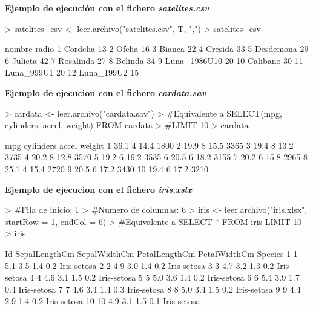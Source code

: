 \documentclass [a4paper] {article}
\begin{document}
\hfil \textbf{Ejemplo de ejecución con el fichero \textit{satelites.csv}} \par
\begin{Schunk}
\begin{Sinput}
> satelites_csv <- leer.archivo("satelites.csv", T, ",")
> satelites_csv
\end{Sinput}
\begin{Soutput}
         nombre radio
1      Cordelia    13
2        Ofelia    16
3        Bianca    22
4       Cresida    33
5     Desdemona    29
6       Julieta    42
7     Rosalinda    27
8       Belinda    34
9  Luna_1986U10    20
10     Calibano    30
11   Luna_999U1    20
12   Luna_199U2    15
\end{Soutput}
\end{Schunk}
\newpage
\hfil \textbf{Ejemplo de ejecucion con el fichero \textit{cardata.sav}} \par
\begin{Schunk}
\begin{Sinput}
> cardata <- leer.archivo("cardata.sav")
> #Equivalente a SELECT(mpg, cylinders, accel, weight) FROM cardata
> #LIMIT 10
> cardata %>% select(mpg, cylinders, accel, weight) %>% head(10)
\end{Sinput}
\begin{Soutput}
    mpg cylinders accel weight
1  36.1         4  14.4   1800
2  19.9         8  15.5   3365
3  19.4         8  13.2   3735
4  20.2         8  12.8   3570
5  19.2         6  19.2   3535
6  20.5         6  18.2   3155
7  20.2         6  15.8   2965
8  25.1         4  15.4   2720
9  20.5         6  17.2   3430
10 19.4         6  17.2   3210
\end{Soutput}
\end{Schunk}
\hfil \textbf{Ejemplo de ejecucion con el fichero \textit{iris.xslx}}
\begin{Schunk}
\begin{Sinput}
> #Fila de inicio: 1
> #Numero de columnas: 6
> iris <- leer.archivo("iris.xlsx", startRow = 1, endCol = 6)
> #Equivalente a SELECT * FROM iris LIMIT 10
> iris %>% head(10)
\end{Sinput}
\begin{Soutput}
   Id SepalLengthCm SepalWidthCm PetalLengthCm PetalWidthCm     Species
1   1           5.1          3.5           1.4          0.2 Iris-setosa
2   2           4.9          3.0           1.4          0.2 Iris-setosa
3   3           4.7          3.2           1.3          0.2 Iris-setosa
4   4           4.6          3.1           1.5          0.2 Iris-setosa
5   5           5.0          3.6           1.4          0.2 Iris-setosa
6   6           5.4          3.9           1.7          0.4 Iris-setosa
7   7           4.6          3.4           1.4          0.3 Iris-setosa
8   8           5.0          3.4           1.5          0.2 Iris-setosa
9   9           4.4          2.9           1.4          0.2 Iris-setosa
10 10           4.9          3.1           1.5          0.1 Iris-setosa
\end{Soutput}
\end{Schunk}
\end{document}
